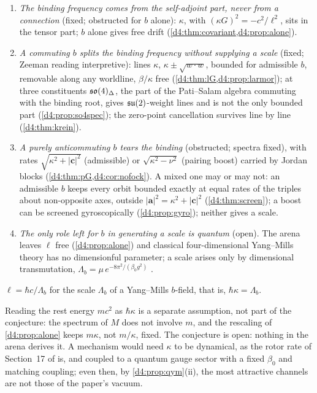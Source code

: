 \begin{enumerate}[label=(\alph*),leftmargin=2.2em]
\item \emph{The binding frequency comes from the self-adjoint part, never from a connection} (fixed; obstructed for $b$ alone): $\kappa$, with
$(\kappa G)^2=-c^2/\ell^2$, sits in the tensor part; $b$ alone gives free drift (\cref{d4:thm:covariant,d4:prop:alone}).
\item \emph{A commuting $b$ splits the binding frequency without supplying a scale} (fixed; Zeeman reading interpretive): lines $\kappa$,
$\kappa\pm\sqrt{w\cdot w}$, bounded for admissible $b$, removable along any worldline, $\beta/\kappa$ free (\cref{d4:thm:lG,d4:prop:larmor}); at three
constituents $\mathfrak{so}(4)_\Delta$, the part of the Pati--Salam algebra commuting with the binding root, gives $\mathfrak{su}(2)$-weight lines and is not the only
bounded part (\cref{d4:prop:so4spec}); the zero-point cancellation survives line by line (\cref{d4:thm:krein}).
\item \emph{A purely anticommuting $b$ tears the binding} (obstructed; spectra fixed), with rates $\sqrt{\kappa^2+|\mathbf c|^2}$ (admissible) or
$\sqrt{\kappa^2-\nu^2}$ (pairing boost) carried by Jordan blocks (\cref{d4:thm:pG,d4:cor:nofock}). A mixed one may or may not: an admissible $b$ keeps
every orbit bounded exactly at equal rates of the triples about non-opposite axes, outside $|\mathbf a|^2=\kappa^2+|\mathbf c|^2$
(\cref{d4:thm:screen}); a boost can be screened gyroscopically (\cref{d4:prop:gyro}); neither gives a scale.
\item \emph{The only role left for $b$ in generating a scale is quantum} (open). The arena leaves $\ell$ free (\cref{d4:prop:alone}) and classical
four-dimensional Yang--Mills theory has no dimensionful parameter; a scale arises only by dimensional transmutation,
$\Lambda_b=\mu\,e^{-8\pi^2/(\beta_0g^2)}$ \cite{ColemanWeinberg73,GrossWilczek73}.
\end{enumerate}

\begin{conjecture}
\label{d4:conj:transmute}
$\ell=\hbar c/\Lambda_b$ for the scale $\Lambda_b$ of a Yang--Mills $b$-field, that is, $\hbar\kappa=\Lambda_b$.
\end{conjecture}

Reading the rest energy $mc^2$ as $\hbar\kappa$ is a separate assumption, not part of the conjecture: the spectrum of $M$ does not involve $m$, and
the rescaling of \cref{d4:prop:alone} keeps $m\kappa$, not $m/\kappa$, fixed. The conjecture is open: nothing in the arena derives it. A mechanism
would need $\kappa$ to be dynamical, as the rotor rate of Section~17 of \cite{ES17} is, and coupled to a quantum gauge sector with a fixed $\beta_0$
and matching coupling; even then, by \cref{d4:prop:qym}(ii), the most attractive channels are not those of the paper's vacuum.

